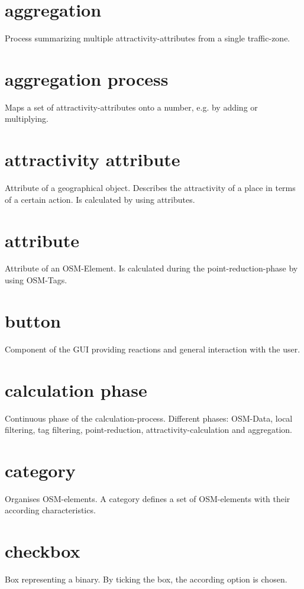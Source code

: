 \documentclass[parskip=full]{report} %
\begin{document}
\section*{aggregation}
Process summarizing multiple attractivity-attributes from a single traffic-zone.

\section*{aggregation process}
Maps a set of attractivity-attributes onto a number, e.g. by adding or multiplying.

\section*{attractivity attribute}
Attribute of a geographical object. Describes the attractivity of a place in terms of a certain action. Is calculated by using attributes.

\section*{attribute}
Attribute of an OSM-Element. Is calculated during the point-reduction-phase by using OSM-Tags.

\section*{button}
Component of the GUI providing reactions and general interaction with the user.

\section*{calculation phase}
Continuous phase of the calculation-process. Different phases: OSM-Data, local filtering, tag filtering, point-reduction, attractivity-calculation and aggregation.

\section*{category}
Organises OSM-elements. A category defines a set of OSM-elements with their according characteristics.

\section*{checkbox}
Box representing a binary. By ticking the box, the according option is chosen.
\end{document}
